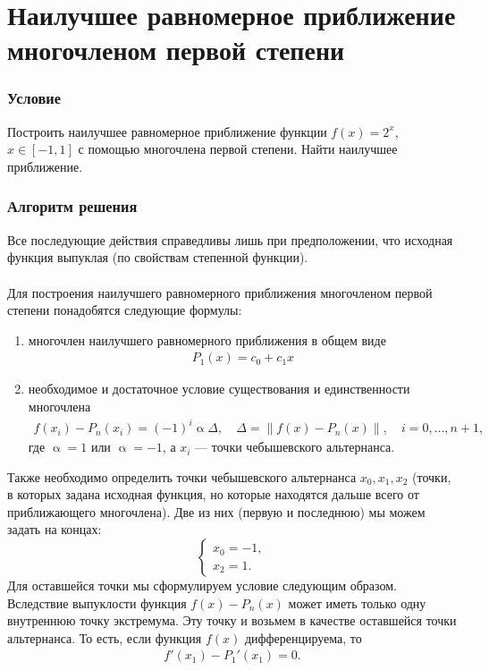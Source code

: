 \documentclass[a4paper, 12pt]{article}
\renewcommand{\alpha}{\upalpha}
\newcommand\Norm[1]{\left\| #1 \right\|}
\begin{document}
	\section*{Наилучшее равномерное приближение многочленом первой степени}
	\subsubsection*{Условие}
	Построить наилучшее равномерное приближение функции $f(x) = 2^x$, $x\in [-1,1]$ с помощью многочлена первой степени. Найти наилучшее приближение.
	\subsubsection*{Алгоритм решения}
	Все последующие действия справедливы лишь при предположении, что исходная функция выпуклая (по свойствам степенной функции).\\\\
	Для построения наилучшего равномерного приближения многочленом первой степени понадобятся следующие формулы:
	\begin{enumerate}
		\item многочлен наилучшего равномерного приближения в общем виде \begin{eqnarray}
		P_1(x) = c_0 + c_1x
		\end{eqnarray}
		\item необходимое и достаточное условие существования и единственности многочлена \begin{eqnarray}
			f(x_i) - P_n(x_i) = (-1)^i\alpha\Delta,\quad \Delta = \Norm{f(x) - P_n(x)},\quad i = 0,\ldots,n+1,
		\end{eqnarray}
		где $\alpha=1$ или $\alpha = -1$, а $x_i$ --- точки чебышевского альтернанса.
	\end{enumerate}
	Также необходимо определить точки чебышевского альтернанса $x_0,x_1,x_2$ (точки, в которых задана исходная функция, но которые находятся дальше всего от приближающего многочлена). Две из них (первую и последнюю) мы можем задать на концах:
	$$\begin{cases}
		x_0 = -1,\\
		x_2 = 1.
	\end{cases}$$
	Для оставшейся точки мы сформулируем условие следующим образом. Вследствие выпуклости функция $f(x) - P_n(x)$ может иметь только одну внутреннюю точку экстремума. Эту точку и возьмем в качестве оставшейся точки альтернанса. То есть, если функция $f(x)$ дифференцируема, то  \begin{eqnarray}
	f'(x_1) - P_1'(x_1) = 0.
	\end{eqnarray}
\end{document}
